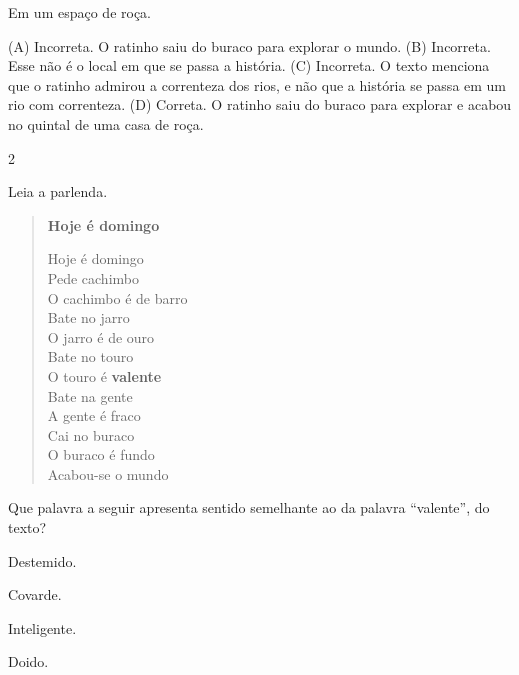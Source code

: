 \begin{boxlist}
\begin{escolha}
\item Em um espaço de roça.
\end{escolha}


(A) Incorreta. O ratinho saiu do buraco para explorar o mundo.
(B) Incorreta. Esse não é o local em que se passa a história.
(C) Incorreta. O texto menciona que o ratinho admirou a correnteza dos
rios, e não que a história se passa em um rio com correnteza.
(D) Correta. O ratinho saiu do buraco para explorar e acabou no quintal
de uma casa de roça.

\num{2}

Leia a parlenda.

\begin{verse}
\textbf{Hoje é domingo}

Hoje é domingo\\
Pede cachimbo\\
O cachimbo é de barro\\
Bate no jarro\\
O jarro é de ouro\\
Bate no touro\\
O touro é \textbf{valente}\\
Bate na gente\\
A gente é fraco\\
Cai no buraco\\
O buraco é fundo\\
Acabou-se o mundo

\end{verse}

Que palavra a seguir apresenta sentido semelhante ao da palavra
``valente'', do texto?

\begin{escolha}
\item Destemido.

\item Covarde.

\item Inteligente.

\item Doido.
\end{escolha}



\end{boxlist}

